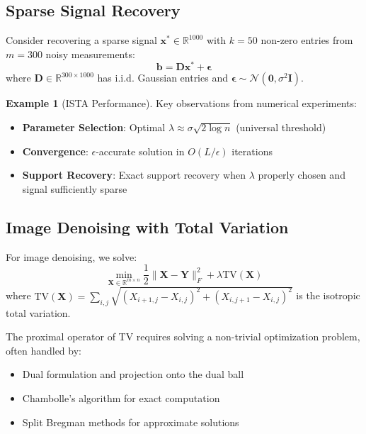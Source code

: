 \documentclass[12pt]{article}
\renewcommand{\vec}[1]{\mathbf{#1}}
\newcommand{\norm}[1]{\lVert #1 \rVert}
\newcommand{\R}{\mathbb{R}}
\theoremstyle{definition}
\newtheorem{example}{Example}[section]
\begin{document}
\subsection{Sparse Signal Recovery}

Consider recovering a sparse signal $\vec{x}^* \in \R^{1000}$ with $k = 50$ non-zero entries from $m = 300$ noisy measurements:
\begin{equation}
    \vec{b} = \vec{D}\vec{x}^* + \vec{\epsilon}
\end{equation}
where $\vec{D} \in \R^{300 \times 1000}$ has i.i.d. Gaussian entries and $\vec{\epsilon} \sim \mathcal{N}(\vec{0}, \sigma^2\vec{I})$.

\begin{example}[ISTA Performance]
    Key observations from numerical experiments:
    \begin{itemize}[leftmargin=*]
        \item \textbf{Parameter Selection}: Optimal $\lambda \approx \sigma\sqrt{2\log n}$ (universal threshold)
        \item \textbf{Convergence}: $\epsilon$-accurate solution in $O(L/\epsilon)$ iterations
        \item \textbf{Support Recovery}: Exact support recovery when $\lambda$ properly chosen and signal sufficiently sparse
    \end{itemize}
\end{example}

\subsection{Image Denoising with Total Variation}

For image denoising, we solve:
\begin{equation}
    \min_{\vec{X} \in \R^{m \times n}} \frac{1}{2}\norm{\vec{X} - \vec{Y}}_F^2 + \lambda \text{TV}(\vec{X})
\end{equation}
where $\text{TV}(\vec{X}) = \sum_{i,j} \sqrt{(X_{i+1,j} - X_{i,j})^2 + (X_{i,j+1} - X_{i,j})^2}$ is the isotropic total variation.

The proximal operator of TV requires solving a non-trivial optimization problem, often handled by:
\begin{itemize}[leftmargin=*]
    \item Dual formulation and projection onto the dual ball
    \item Chambolle's algorithm for exact computation
    \item Split Bregman methods for approximate solutions
\end{itemize}
\end{document}
